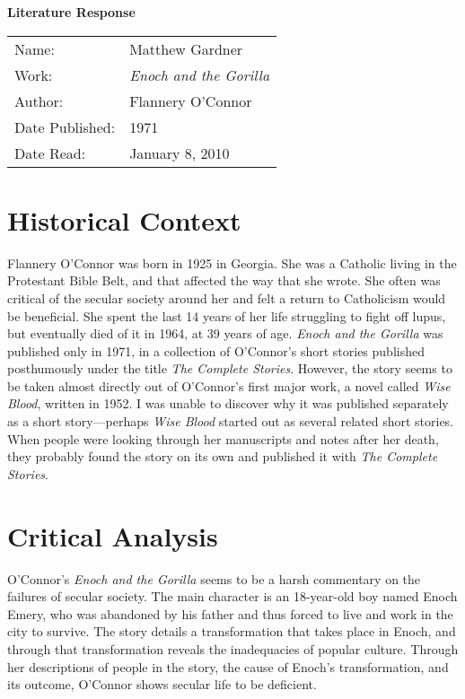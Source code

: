 \documentclass[onecolumn, 12pt]{article}
\title{}
\author{Matthew Gardner}
\date{}
\begin{document}
\textbf{Literature Response}

\begin{tabular}{ll}
  Name:&Matthew Gardner \\
  Work:&\emph{Enoch and the Gorilla} \\
  Author:&Flannery O'Connor \\
  Date Published:& 1971 \\
  Date Read:& January 8, 2010 \\
\end{tabular}

\section*{Historical Context}

Flannery O'Connor was born in 1925 in Georgia.  She was a Catholic living in
the Protestant Bible Belt, and that affected the way that she wrote.  She often
was critical of the secular society around her and felt a return to Catholicism
would be beneficial.  She spent the last 14 years of her life struggling to
fight off lupus, but eventually died of it in 1964, at 39 years of age.
\emph{Enoch and the Gorilla} was published only in 1971, in a collection of
O'Connor's short stories published posthumously under the title \emph{The
Complete Stories}.  However, the story seems to be taken almost directly out of
O'Connor's first major work, a novel called \emph{Wise Blood}, written in 1952.
I was unable to discover why it was published separately as a short
story---perhaps \emph{Wise Blood} started out as several related short stories.
When people were looking through her manuscripts and notes after her death,
they probably found the story on its own and published it with \emph{The
Complete Stories}.

\section*{Critical Analysis}

O'Connor's \emph{Enoch and the Gorilla} seems to be a harsh commentary on the
failures of secular society.  The main character is an 18-year-old boy named
Enoch Emery, who was abandoned by his father and thus forced to live and work
in the city to survive.  The story details a transformation that takes place in
Enoch, and through that transformation reveals the inadequacies of popular
culture.  Through her descriptions of people in the story, the cause of Enoch's
transformation, and its outcome, O'Connor shows secular life to be deficient.
\end{document}
